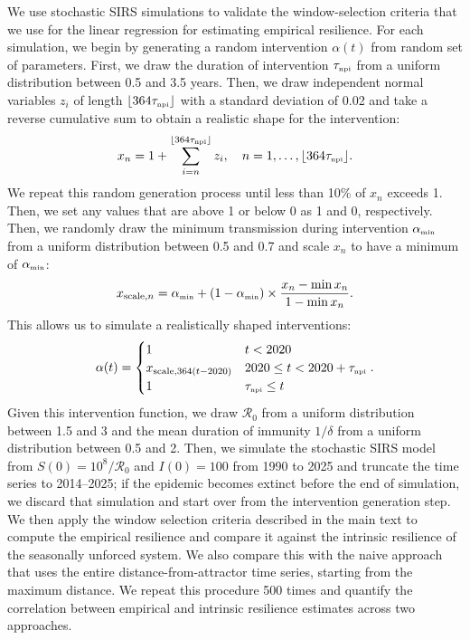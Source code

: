 \documentclass[12pt]{article}
\newcommand{\tsub}[2]{#1_{{\textrm{\tiny #2}}}}
\begin{document}
We use stochastic SIRS simulations to validate the window-selection criteria that we use for the linear regression for estimating empirical resilience.
For each simulation, we begin by generating a random intervention $\alpha(t)$ from random set of parameters.
First, we draw the duration of intervention $\tsub{\tau}{npi}$ from a uniform distribution between 0.5 and 3.5 years.
Then, we draw independent normal variables $z_i$ of length $\lfloor 364 \tsub{\tau}{npi} \rfloor$ with a standard deviation of 0.02 and take a reverse cumulative sum to obtain a realistic shape for the intervention:
\begin{equation}
x_n = 1 + \sum_{i=n}^{\lfloor 364 \tsub{\tau}{npi}\rfloor} z_i, \quad n = 1, \dots, \lfloor 364 \tsub{\tau}{npi}\rfloor.
\end{equation}
We repeat this random generation process until less than 10\% of $x_n$ exceeds 1.
Then, we set any values that are above 1 or below 0 as 1 and 0, respectively.
Then, we randomly draw the minimum transmission during intervention $\tsub{\alpha}{min}$ from a uniform distribution between 0.5 and 0.7 and scale $x_n$ to have a minimum of $\tsub{\alpha}{min}$:
\begin{equation}
x_{\textrm{scale},n} =  \tsub{\alpha}{min} + (1- \tsub{\alpha}{min}) \times \frac{x_n-\min x_n}{1- \min x_n}.
\end{equation}
This allows us to simulate a realistically shaped interventions:
\begin{equation}
\alpha(t) = \begin{cases}
1 & t < 2020\\
x_{\textrm{scale},364(t-2020)} & 2020 \leq t < 2020 + \tsub{\tau}{npi}\\
1 & \tsub{\tau}{npi} \leq t
\end{cases}.
\end{equation}
Given this intervention function, we draw $\mathcal R_0$ from a uniform distribution between 1.5 and 3 and the mean duration of immunity $1/\delta$ from a uniform distribution between 0.5 and 2.
Then, we simulate the stochastic SIRS model from $S(0) = 10^8/\mathcal R_0$ and $I(0) = 100$ from 1990 to 2025 and truncate the time series to 2014--2025;
if the epidemic becomes extinct before the end of simulation, we discard that simulation and start over from the intervention generation step.
We then apply the window selection criteria described in the main text to compute the empirical resilience and compare it against the intrinsic resilience of the seasonally unforced system.
We also compare this with the naive approach that uses the entire distance-from-attractor time series, starting from the maximum distance.
We repeat this procedure 500 times and quantify the correlation between empirical and intrinsic resilience estimates across two approaches.
\end{document}
